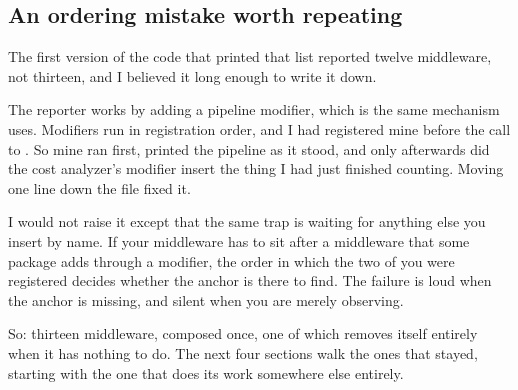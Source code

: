 \subsection*{An ordering mistake worth repeating}

%
The first version of the code that printed that list reported twelve middleware,
not thirteen, and I believed it long enough to write it down.

The reporter works by adding a pipeline modifier, which is the same mechanism
 uses. Modifiers run in registration order, and I had registered
mine before the call to . So mine ran first, printed the
pipeline as it stood, and only afterwards did the cost analyzer's modifier
insert the thing I had just finished counting. Moving one line down the file
fixed it.

I would not raise it except that the same trap is waiting for anything else you
insert by name. If your middleware has to sit after a middleware that some
package adds through a modifier, the order in which the two of you were
registered decides whether the anchor is there to find. The failure is loud when
the anchor is missing, and silent when you are merely observing.

So: thirteen middleware, composed once, one of which removes itself entirely
when it has nothing to do. The next four sections walk the ones that stayed,
starting with the one that does its work somewhere else entirely.

